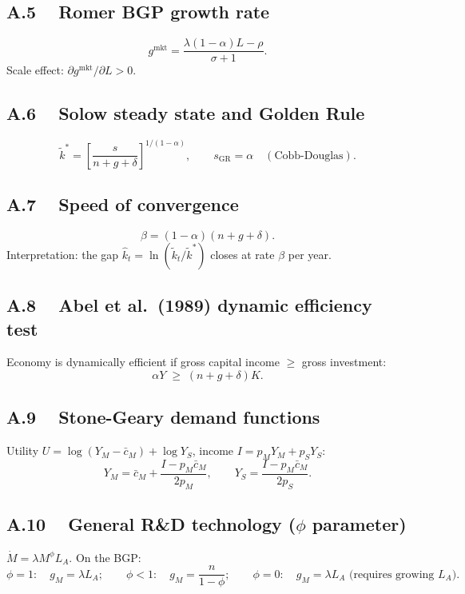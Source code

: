 \documentclass[a4paper,11pt]{article}
\newcommand{\ktilde}{\tilde{k}}
\begin{document}
\subsection*{A.5 ~ Romer BGP growth rate}
\[
    g^{\mathrm{mkt}} = \frac{\lambda(1-\alpha)L - \rho}{\sigma + 1}.
\]
Scale effect: $\partial g^{\mathrm{mkt}}/\partial L > 0$.

\subsection*{A.6 ~ Solow steady state and Golden Rule}
\[
    \ktilde^* = \left[\frac{s}{n+g+\delta}\right]^{1/(1-\alpha)}, \qquad
    s_{\mathrm{GR}} = \alpha \quad (\text{Cobb-Douglas}).
\]

\subsection*{A.7 ~ Speed of convergence}
\[
    \beta = (1-\alpha)(n+g+\delta).
\]
Interpretation: the gap $\hat{k}_t = \ln(\ktilde_t/\ktilde^*)$ closes at rate $\beta$ per year.

\subsection*{A.8 ~ Abel et al.\ (1989) dynamic efficiency test}
Economy is dynamically efficient if gross capital income $\geq$ gross investment:
\[
    \alpha Y \;\geq\; (n+g+\delta)K.
\]

\subsection*{A.9 ~ Stone-Geary demand functions}
Utility $U = \log(Y_M - \bar{c}_M) + \log Y_S$, income $I = p_M Y_M + p_S Y_S$:
\[
    Y_M = \bar{c}_M + \frac{I - p_M\bar{c}_M}{2p_M},
    \qquad
    Y_S = \frac{I - p_M\bar{c}_M}{2p_S}.
\]

\subsection*{A.10 ~ General R\&D technology ($\phi$ parameter)}
$\dot{M} = \lambda M^{\phi} L_A$.  On the BGP:
\[
    \phi = 1{:}\quad g_M = \lambda L_A; \qquad
    \phi < 1{:}\quad g_M = \frac{n}{1-\phi}; \qquad
    \phi = 0{:}\quad g_M = \lambda L_A \text{ (requires growing $L_A$)}.
\]
\end{document}
